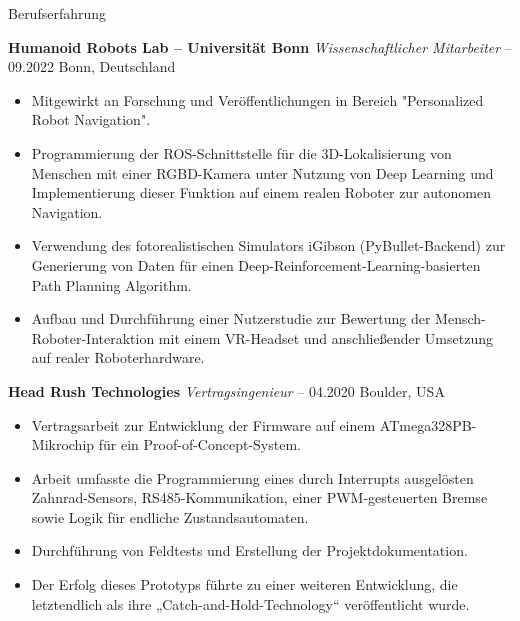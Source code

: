 \begin{rubric}{Berufserfahrung}

%
%
\entry*[] \textbf{Humanoid Robots Lab -- Universität Bonn} \hfill \textit{Wissenschaftlicher Mitarbeiter}  -- 09.2022 \hfill Bonn, Deutschland \newline  
\vspace{\CVItemizeHeaderSpacing} \begin{itemize}
	\setlength{\itemsep}{\CVItemizeSpacing}  
	\item Mitgewirkt an Forschung und Veröffentlichungen in Bereich "Personalized Robot Navigation".  
	\item Programmierung der ROS-Schnittstelle für die 3D-Lokalisierung von Menschen mit einer RGBD-Kamera unter Nutzung von Deep Learning und Implementierung dieser Funktion auf einem realen Roboter zur autonomen Navigation.  
	\item Verwendung des fotorealistischen Simulators iGibson (PyBullet-Backend) zur Generierung von Daten für einen Deep-Reinforcement-Learning-basierten Path Planning Algorithm.  
	\item Aufbau und Durchführung einer Nutzerstudie zur Bewertung der Mensch-Roboter-Interaktion mit einem VR-Headset und anschließender Umsetzung auf realer Roboterhardware.  
\end{itemize}

%
%
\entry*[] \textbf{Head Rush Technologies} \hfill \textit{Vertragsingenieur}  -- 04.2020 \hfill Boulder, USA \newline  
\vspace{\CVItemizeHeaderSpacing} \begin{itemize} 
	\setlength{\itemsep}{\CVItemizeSpacing}  
	\item Vertragsarbeit zur Entwicklung der Firmware auf einem ATmega328PB-Mikrochip für ein Proof-of-Concept-System.  
	\item Arbeit umfasste die Programmierung eines durch Interrupts ausgelösten Zahnrad-Sensors, RS485-Kommunikation, einer PWM-gesteuerten Bremse sowie Logik für endliche Zustandsautomaten.  
	\item Durchführung von Feldtests und Erstellung der Projektdokumentation.  
	\item Der Erfolg dieses Prototyps führte zu einer weiteren Entwicklung, die letztendlich als ihre „Catch-and-Hold-Technology“ veröffentlicht wurde.  
\end{itemize}



\end{rubric}
